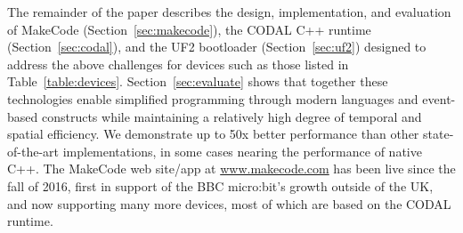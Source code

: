 The remainder of the paper describes the design, implementation, and evaluation of MakeCode (Section~\ref{sec:makecode}), the CODAL C++ runtime (Section~\ref{sec:codal}), and the UF2 bootloader (Section~\ref{sec:uf2}) designed to address the above challenges for devices such as those listed in Table~\ref{table:devices}. Section~\ref{sec:evaluate} shows that together these technologies enable simplified programming through modern languages and event-based constructs while maintaining a relatively high degree of temporal and spatial efficiency. We demonstrate up to 50x better performance than other state-of-the-art implementations, in some cases nearing the performance of native C++. The MakeCode
web site/app at \url{www.makecode.com} has been live since the fall of 2016, 
first in support of the BBC micro:bit's growth outside of the UK, and now supporting
many more devices, most of which are based on the CODAL runtime. 









